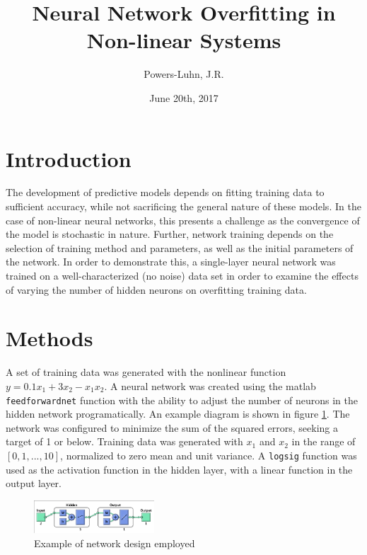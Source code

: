\documentclass{IEEEtran}
\author{Powers-Luhn, J.R.}
\title{Neural Network Overfitting in Non-linear Systems}
\date{June 20th, 2017}
\begin{document}
\maketitle

\section{Introduction}
The development of predictive models depends on fitting training data to sufficient accuracy, while not sacrificing the general nature of these models. In the case of non-linear neural networks, this presents a challenge as the convergence of the model is stochastic in nature. Further, network training depends on the selection of training method and parameters, as well as the initial parameters of the network. In order to demonstrate this, a single-layer neural network was trained on a well-characterized (no noise) data set in order to examine the effects of varying the number of hidden neurons on overfitting training data.

\section{Methods}
A set of training data was generated with the nonlinear function $y = 0.1 x_1 + 3 x_2 - x_1 x_2 $. A neural network was created using the matlab \verb|feedforwardnet| function with the ability to adjust the number of neurons in the hidden network programatically. An example diagram is shown in figure \ref{fig:example_network}. The network was configured to minimize the sum of the squared errors, seeking a target of 1 or below. Training data was generated with $x_1$ and $x_2$ in the range of $\left[0, 1, ..., 10 \right]$, normalized to zero mean and unit variance. A \verb|logsig| function was used as the activation function in the hidden layer, with a linear function in the output layer.

\begin{centering}
\begin{figure}
\begin{center}
	\includegraphics[width=0.4\textwidth]{network}
	\caption{Example of network design employed\label{fig:example_network}}
\end{center}
\end{figure}
\end{centering}
\end{document}
